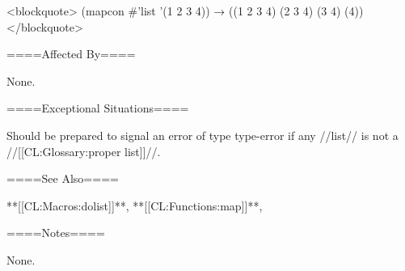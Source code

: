 <blockquote> (mapcon #'list '(1 2 3 4)) → ((1 2 3 4) (2 3 4) (3 4) (4)) </blockquote>

====Affected By====

None.

====Exceptional Situations====

Should be prepared to signal an error of type type-error if any //list// is not a //[[CL:Glossary:proper list]]//.

====See Also====

**[[CL:Macros:dolist]]**, **[[CL:Functions:map]]**,

{\secref\TraversalRules}

====Notes====

None.

  
